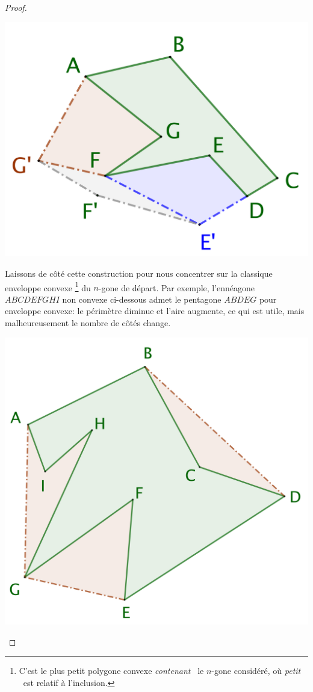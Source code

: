 \begin{proof}
	\begin{center}
		\includegraphics[scale=.4]{content/polygon/polygon-non-convex-bad.png}
	\end{center}


	Laissons de côté cette construction pour nous concentrer sur la classique enveloppe convexe%
	\footnote{
		C'est le plus petit polygone convexe \og \emph{contenant} \fg\ le $n$-gone considéré, où \og \emph{petit} \fg\ est relatif à l'inclusion.
	}
	du $n$-gone de départ.
	Par exemple, l'ennéagone $ABCDEFGHI$ non convexe ci-dessous admet le pentagone $ABDEG$ pour enveloppe convexe: le périmètre diminue et l'aire augmente, ce qui est utile, mais malheureusement le nombre de côtés change.
	
	\begin{center}
		\includegraphics[scale=.4]{content/polygon/polygon-convex-hull.png}
	\end{center}


\end{proof}
